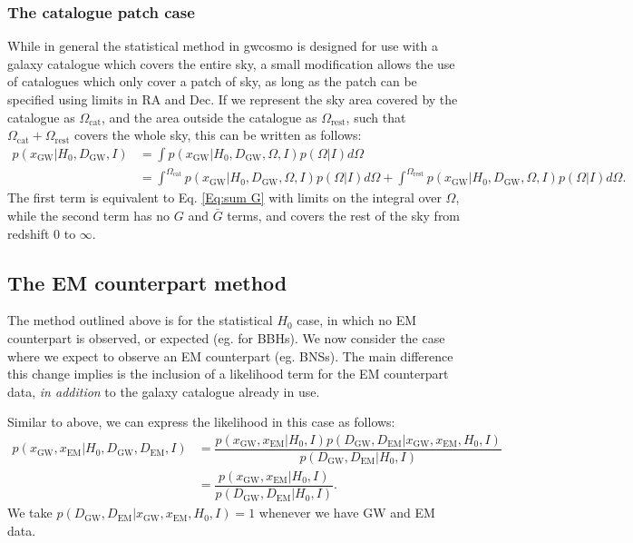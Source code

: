 \documentclass[a4paper,10pt]{article}
\begin{document}
\subsubsection{The catalogue patch case}
While in general the statistical method in gwcosmo is designed for use with a galaxy catalogue which covers the entire sky, a small modification allows the use of catalogues which only cover a patch of sky, as long as the patch can be specified using limits in RA and Dec.  If we represent the sky area covered by the catalogue as $\Omega_{\text{cat}}$, and the area outside the catalogue as $\Omega_{\text{rest}}$, such that $\Omega_{\text{cat}}+\Omega_{\text{rest}}$ covers the whole sky, this can be written as follows:
\begin{equation}
\begin{aligned}
p(x_{\text{GW}}|H_0,D_{\text{GW}},I) &= \int p(x_{\text{GW}}|H_0,D_{\text{GW}},\Omega,I)p(\Omega|I) d\Omega
\\&=  \int^{\Omega_{\text{cat}}} p(x_{\text{GW}}|H_0,D_{\text{GW}},\Omega,I)p(\Omega|I) d\Omega + \int^{\Omega_{\text{rest}}}p(x_{\text{GW}}|H_0,D_{\text{GW}},\Omega,I)p(\Omega|I) d\Omega.
\end{aligned} 
\end{equation}
The first term is equivalent to Eq. \ref{Eq:sum G} with limits on the integral over $\Omega$, while the second term has no $G$ and $\bar{G}$ terms, and covers the rest of the sky from redshift 0 to $\infty$.


\subsection{The EM counterpart method}
The method outlined above is for the statistical $H_0$ case, in which no EM counterpart is observed, or expected (eg. for BBHs).  We now consider the case where we expect to observe an EM counterpart (eg. BNSs).  The main difference this change implies is the inclusion of a likelihood term for the EM counterpart data, \emph{in addition} to the galaxy catalogue already in use.

Similar to above, we can express the likelihood in this case as follows:
\begin{equation}
\begin{aligned}
p(x_{\text{GW}},x_{\text{EM}}|H_0,D_{\text{GW}},D_{\text{EM}},I) &= \dfrac{p(x_{\text{GW}},x_{\text{EM}}|H_0,I) p(D_{\text{GW}},D_{\text{EM}}|x_{\text{GW}},x_{\text{EM}},H_0,I)}{p(D_{\text{GW}},D_{\text{EM}}|H_0,I)}
\\&= \dfrac{p(x_{\text{GW}},x_{\text{EM}}|H_0,I)}{p(D_{\text{GW}},D_{\text{EM}}|H_0,I)}.
\end{aligned} 
\end{equation}
We take $p(D_{\text{GW}},D_{\text{EM}}|x_{\text{GW}},x_{\text{EM}},H_0,I)=1$ whenever we have GW and EM data.
\end{document}
